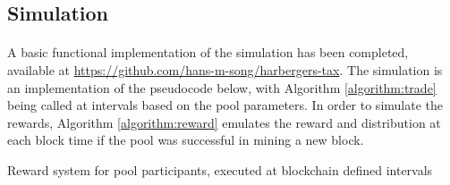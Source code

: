 \subsection{Simulation}

\paragraph{} A basic functional implementation of the simulation has been completed, available at \url{https://github.com/hans-m-song/harbergers-tax}. The simulation is an implementation of the pseudocode below, with Algorithm \ref{algorithm:trade} being called at intervals based on the pool parameters. In order to simulate the rewards, Algorithm \ref{algorithm:reward} emulates the reward and distribution at each block time if the pool was successful in mining a new block.

\begin{algorithm}[H]
  \caption{Reward system for pool participants, executed at blockchain defined intervals}
  \label{algorithm:reward}
  \begin{algorithmic}[1]
     
         
      \EndFor
    \EndProcedure
  \end{algorithmic}
\end{algorithm}

